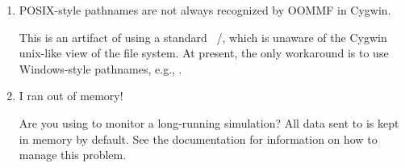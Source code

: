 \begin{enumerate}
\item POSIX-style pathnames are not always recognized by OOMMF in
Cygwin.

This is an artifact of using a standard \Windows\ \Tcl/\Tk, which is
unaware of the Cygwin unix-like view of the file system.  At present,
the only workaround is to use Windows-style pathnames, e.g.,
.

\item I ran out of memory!

Are you using  to monitor a
long-running simulation?  All data sent to  is kept in
memory by default.  See the  documentation for information
on how to manage this problem.

\end{enumerate}



